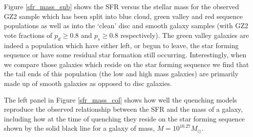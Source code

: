 \documentclass[useAMS,usenatbib]{mn2e}
\begin{document}
Figure \ref{sfr_mass_sub} shows the SFR versus the stellar mass for the observed GZ2 sample which has been split into blue cloud, green valley and red sequence populations as well as into the `clean' disc and smooth galaxy samples (with GZ2 vote fractions of $p_d \geq 0.8$ and $p_s \geq 0.8$ respectively). The green valley galaxies are indeed a population which have either left, or begun to leave, the star forming sequence or have some residual star formation still occurring. Interestingly, when we compare those galaxies which reside on the star forming sequence we find that the tail ends of this population (the low and high mass  galaxies) are primarily made up of smooth galaxies as opposed to disc galaxies.



The left panel in Figure \ref{sfr_mass_col} shows how well the quenching models reproduce the observed relationship between the SFR and the mass of a galaxy, including how at the time of quenching they reside on the star forming sequence shown by the solid black line for a galaxy of mass, $M = 10^{10.27} M_{\odot}$.  %
\end{document}
